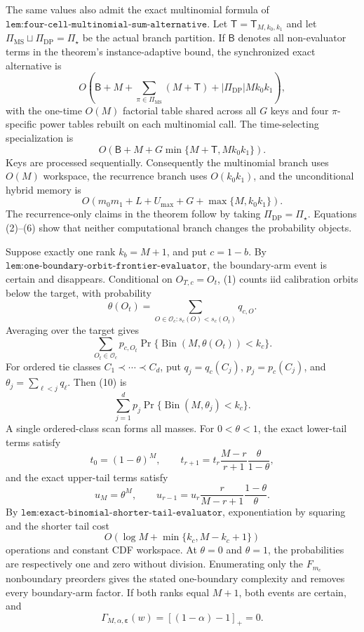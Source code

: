 The same values also admit the exact multinomial formula of \(\texttt{lem:four-cell-multinomial-sum-alternative}\).  Let \(\mathsf T=\mathsf T_{M,k_0,k_1}\) and let \(\Pi_{\mathrm{MS}}\sqcup\Pi_{\mathrm{DP}}=\Pi_\star\) be the actual branch partition.  If \(\mathsf B\) denotes all non-evaluator terms in the theorem's instance-adaptive bound, the synchronized exact alternative is
\[
O\!\left(
\mathsf B+M+\sum_{\pi\in\Pi_{\mathrm{MS}}}(M+\mathsf T)
+|\Pi_{\mathrm{DP}}|Mk_0k_1
\right), \tag{7}
\]
with the one-time \(O(M)\) factorial table shared across all \(G\) keys and four \(\pi\)-specific power tables rebuilt on each multinomial call.  The time-selecting specialization is
\[
O\!\left(\mathsf B+M+G\min\{M+\mathsf T,Mk_0k_1\}\right). \tag{8}
\]
Keys are processed sequentially.  Consequently the multinomial branch uses \(O(M)\) workspace, the recurrence branch uses \(O(k_0k_1)\), and the unconditional hybrid memory is
\[
O\!\left(m_0m_1+L+U_{\max}+G+\max\{M,k_0k_1\}\right). \tag{9}
\]
The recurrence-only claims in the theorem follow by taking \(\Pi_{\mathrm{DP}}=\Pi_\star\).  Equations (2)--(6) show that neither computational branch changes the probability objects.

Suppose exactly one rank \(k_b=M+1\), and put \(c=1-b\).  By \(\texttt{lem:one-boundary-orbit-frontier-evaluator}\), the boundary-arm event is certain and disappears.  Conditional on \(O_{T,c}=O_t\), (1) counts iid calibration orbits below the target, with probability
\[
\theta(O_t)=\sum_{O\in\mathcal O_c:s_c(O)<s_c(O_t)}q_{c,O}.
\]
Averaging over the target gives
\[
\sum_{O_t\in\mathcal O_c}p_{c,O_t}
\Pr\{\operatorname{Bin}(M,\theta(O_t))<k_c\}. \tag{10}
\]
For ordered tie classes \(C_1\prec\cdots\prec C_d\), put \(q_j=q_c(C_j)\), \(p_j=p_c(C_j)\), and \(\theta_j=\sum_{\ell<j}q_\ell\).  Then (10) is
\[
\sum_{j=1}^d p_j\Pr\{\operatorname{Bin}(M,\theta_j)<k_c\}. \tag{11}
\]
A single ordered-class scan forms all masses.  For \(0<\theta<1\), the exact lower-tail terms satisfy
\[
t_0=(1-\theta)^M,\qquad
t_{r+1}=t_r\frac{M-r}{r+1}\frac{\theta}{1-\theta}, \tag{12}
\]
and the exact upper-tail terms satisfy
\[
u_M=\theta^M,\qquad
u_{r-1}=u_r\frac{r}{M-r+1}\frac{1-\theta}{\theta}. \tag{13}
\]
By \(\texttt{lem:exact-binomial-shorter-tail-evaluator}\), exponentiation by squaring and the shorter tail cost
\[
O(\log M+\min\{k_c,M-k_c+1\})
\]
operations and constant CDF workspace.  At \(\theta=0\) and \(\theta=1\), the probabilities are respectively one and zero without division.  Enumerating only the \(F_{m_c}\) nonboundary preorders gives the stated one-boundary complexity and removes every boundary-arm factor.  If both ranks equal \(M+1\), both events are certain, and
\[
\Gamma_{M,\alpha,\boldsymbol\varepsilon}(w)=[(1-\alpha)-1]_+=0. \tag{14}
\]

